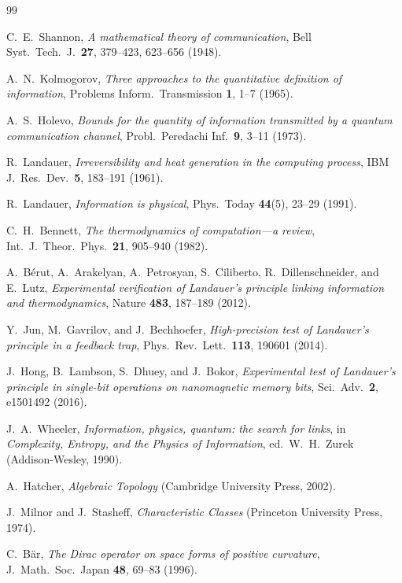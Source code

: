 \documentclass[11pt,a4paper]{article}
\theoremstyle{definition}
\theoremstyle{remark}
\begin{document}
\begin{thebibliography}{99}

C.~E.~Shannon, \emph{A mathematical theory of communication},
Bell Syst.\ Tech.\ J.\ \textbf{27}, 379--423, 623--656 (1948).

A.~N.~Kolmogorov, \emph{Three approaches to the quantitative definition of information},
Problems Inform.\ Transmission \textbf{1}, 1--7 (1965).

A.~S.~Holevo, \emph{Bounds for the quantity of information transmitted by a quantum
communication channel}, Probl.\ Peredachi Inf.\ \textbf{9}, 3--11 (1973).

R.~Landauer, \emph{Irreversibility and heat generation in the computing process},
IBM J.\ Res.\ Dev.\ \textbf{5}, 183--191 (1961).

R.~Landauer, \emph{Information is physical}, Phys.\ Today \textbf{44}(5), 23--29 (1991).

C.~H.~Bennett, \emph{The thermodynamics of computation---a review},
Int.\ J.\ Theor.\ Phys.\ \textbf{21}, 905--940 (1982).

A.~B\'erut, A.~Arakelyan, A.~Petrosyan, S.~Ciliberto, R.~Dillenschneider, and E.~Lutz,
\emph{Experimental verification of Landauer's principle linking information and thermodynamics},
Nature \textbf{483}, 187--189 (2012).

Y.~Jun, M.~Gavrilov, and J.~Bechhoefer,
\emph{High-precision test of Landauer's principle in a feedback trap},
Phys.\ Rev.\ Lett.\ \textbf{113}, 190601 (2014).

J.~Hong, B.~Lambson, S.~Dhuey, and J.~Bokor,
\emph{Experimental test of Landauer's principle in single-bit operations on nanomagnetic
memory bits}, Sci.\ Adv.\ \textbf{2}, e1501492 (2016).

J.~A.~Wheeler, \emph{Information, physics, quantum: the search for links}, in
\emph{Complexity, Entropy, and the Physics of Information}, ed.\ W.~H.~Zurek
(Addison-Wesley, 1990).

A.~Hatcher, \emph{Algebraic Topology} (Cambridge University Press, 2002).

J.~Milnor and J.~Stasheff, \emph{Characteristic Classes}
(Princeton University Press, 1974).

C.~B\"ar, \emph{The Dirac operator on space forms of positive curvature},
J.\ Math.\ Soc.\ Japan \textbf{48}, 69--83 (1996).


\end{thebibliography}
\end{document}

